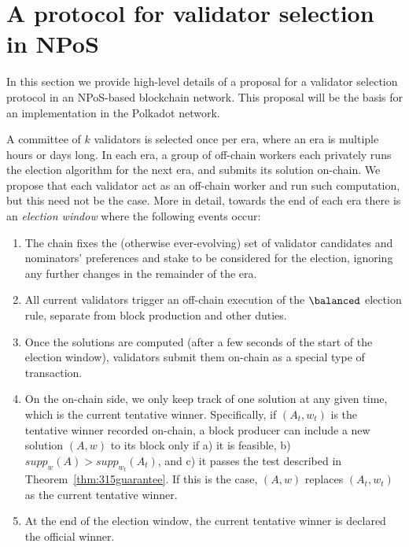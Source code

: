 
\section{A protocol for validator selection in NPoS}\label{s:objectives}

In this section we provide high-level details of a proposal for a validator selection protocol in an NPoS-based blockchain network. This proposal will be the basis for an implementation in the Polkadot network.

A committee of $k$ validators is selected once per era, where an era is multiple hours or days long. 
In each era, a group of off-chain workers each privately runs the election algorithm for the next era, and submits its solution on-chain. 
We propose that each validator act as an off-chain worker and run such computation, but this need not be the case. 
More in detail, towards the end of each era there is an \emph{election window} where the following events occur:
\begin{enumerate}
\item The chain fixes the (otherwise ever-evolving) set of validator candidates and nominators' preferences and stake to be considered for the election, ignoring any further changes in the remainder of the era. 
\item All current validators trigger an off-chain execution of the $\balanced$ election rule, separate from block production and other duties.
\item Once the solutions are computed (after a few seconds of the start of the election window), validators submit them on-chain as a special type of transaction. 
\item On the on-chain side, we only keep track of one solution at any given time, which is the current tentative winner. Specifically, if $(A_t,w_t)$ is the tentative winner recorded on-chain, a block producer can include a new solution $(A,w)$ to its block only if a) it is feasible, b) $supp_w(A)>supp_{w_t}(A_t)$, and c) it passes the test described in Theorem~\ref{thm:315guarantee}. If this is the case, $(A,w)$ replaces $(A_t, w_t)$ as the current tentative winner. 
\item At the end of the election window, the current tentative winner is declared the official winner. 
\end{enumerate}

